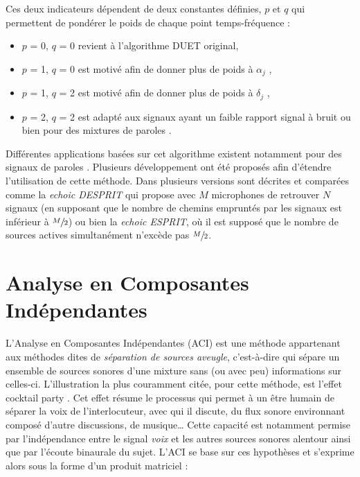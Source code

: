 Ces deux indicateurs dépendent de deux constantes définies, $p$ et $q$ qui permettent de pondérer le poids de chaque point temps-fréquence :

\begin{itemize}
\item $p$ = 0, $q$ = 0 revient à l'algorithme DUET original,
\item $p$ = 1, $q$ = 0 est motivé afin de donner plus de poids à $\alpha_j$ \cite{yilmaz2004blind},
\item $p$ = 1, $q$ = 2 est motivé afin de donner plus de poids à $\delta_j$ \cite{yilmaz2004blind},
\item $p$ = 2, $q$ = 2 est adapté aux signaux ayant un faible rapport signal à bruit ou bien pour des mixtures de paroles \cite{melia2007underdetermined}.\\
\end{itemize}

Différentes applications basées sur cet algorithme existent notamment pour des signaux de paroles \cite{yilmaz2004blind, jourjine2000blind}.
Plusieurs développement ont été proposés afin d'étendre l'utilisation de cette méthode. Dans  \cite{melia2007underdetermined} plusieurs versions sont décrites et comparées comme la \textit{echoic DESPRIT} qui propose avec $M$ microphones de retrouver $N$ signaux (en supposant que le nombre de chemins empruntés par les signaux est inférieur à $\sfrac{M}{2}$) ou bien la \textit{echoic ESPRIT}, où il est supposé que le nombre de sources actives simultanément n'excède pas $\sfrac{M}{2}$. \\


\section{Analyse en Composantes Indépendantes}
L'Analyse en Composantes Indépendantes (ACI) \cite{comon_independent_1994, jutten1991blind} est une méthode appartenant aux méthodes dites de \textit{séparation de sources aveugle}, c'est-à-dire qui sépare un ensemble de sources sonores d'une mixture sans (ou avec peu) informations sur celles-ci. L'illustration la plus couramment citée, pour cette méthode, est l'effet \og cocktail party \fg{}. Cet effet résume le processus qui permet à un être humain de séparer la voix de l'interlocuteur, avec qui il discute, du flux sonore environnant composé d'autre discussions, de musique\dots{} Cette capacité est notamment permise par l'indépendance entre le signal \textit{voix} et les autres sources sonores alentour ainsi que par l'écoute binaurale du sujet. L'ACI se base sur ces hypothèses et s'exprime alors sous la forme d'un produit matriciel :

